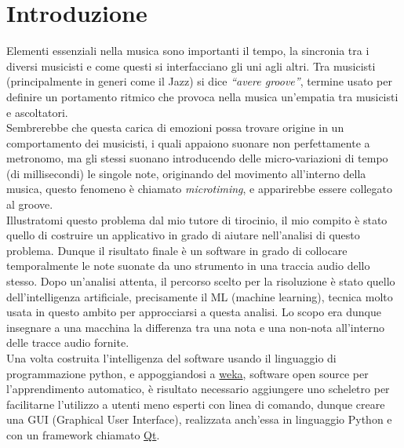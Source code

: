 \chapter*{Introduzione}
\label{cap:introduzione}
\rhead{\thepage}

\pagestyle{plain}
\fancyhf{}
\renewcommand{\headrulewidth}{2pt}
\fancyhead[EL]{\textbf{\textsf{\nouppercase\thepage}}}
\fancyhead[ER]{\textbf{\textsf{\nouppercase\leftmark}}}
\fancyhead[OR]{\textbf{\textsf{\nouppercase\thepage}}}
\fancyhead[OL]{\textbf{\textsf{\nouppercase {\rightmark}}}}

\thispagestyle{empty}

Elementi essenziali nella musica sono importanti il tempo, la sincronia tra i diversi musicisti e come questi si interfacciano gli uni agli altri. Tra musicisti (principalmente in generi come il Jazz) si dice \emph{``avere groove''}, termine usato per definire un portamento ritmico che provoca nella musica un'empatia tra musicisti e ascoltatori\nocite{wiki:groove}.\\
Sembrerebbe che questa carica di emozioni possa trovare origine in un comportamento dei musicisti, i quali appaiono suonare non perfettamente a metronomo, ma gli stessi suonano introducendo delle micro-variazioni di tempo (di millisecondi) le singole note, originando del movimento all'interno della musica, questo fenomeno è chiamato \emph{microtiming}, e apparirebbe essere collegato al groove\nocite{8350302}.\\
Illustratomi questo problema dal mio tutore di tirocinio, il mio compito è stato quello di costruire un applicativo in grado di aiutare nell'analisi di questo problema. Dunque il risultato finale è un software in grado di collocare temporalmente le note suonate da uno strumento in una traccia audio dello stesso. Dopo un'analisi attenta, il percorso scelto per la risoluzione è stato quello dell'intelligenza artificiale, precisamente il ML (machine learning), tecnica molto usata in questo ambito \nocite{Wright06towardsmachine}per approcciarsi a questa analisi. Lo scopo era dunque insegnare a una macchina la differenza tra una nota e una non-nota all'interno delle tracce audio fornite.\\
Una volta costruita l'intelligenza del software usando il linguaggio di programmazione python, e appoggiandosi a \href{https://www.cs.waikato.ac.nz/ml/weka/}{weka}, software open source per l'apprendimento automatico, è risultato necessario aggiungere uno scheletro per facilitarne l'utilizzo a utenti meno esperti con linea di comando, dunque creare una GUI (Graphical User Interface), realizzata anch'essa in linguaggio Python e con un framework chiamato \href{https://www.qt.io/}{Qt}.\\

